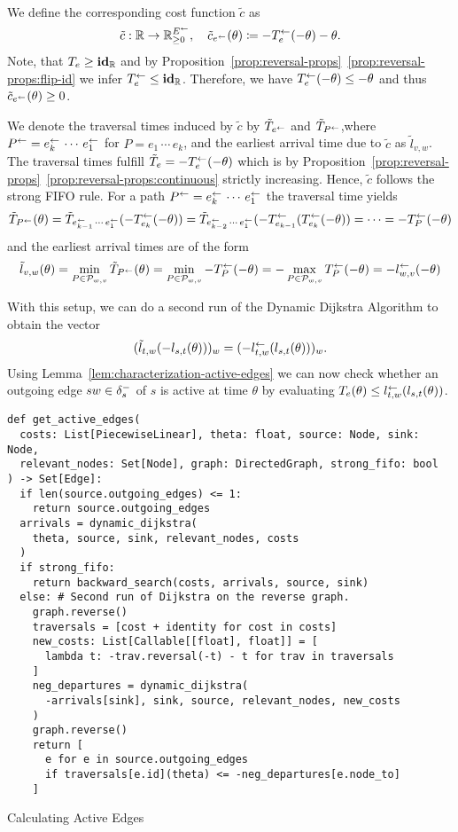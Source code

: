 We define the corresponding cost function $\tilde c$ as \[
    \tilde c : \mathbb{R} \rightarrow \mathbb{R}_{\geq0}^{E^{\leftarrow}}, \quad
    \tilde c_{e^{\leftarrow}}(\theta) \coloneqq - T_e^{\leftarrow}(-\theta) - \theta.
\]
Note, that $T_e  \geq \mathbf{id}_{\mathbb{R}}$ and by Proposition~\ref{prop:reversal-props}~\ref{prop:reversal-props:flip-id} we infer $T_e^{\leftarrow} \leq \mathbf{id}_{\mathbb{R}}$.
Therefore, we have $T_e^{\leftarrow}(-\theta) \leq -\theta$ and thus $\tilde c_{e^{\leftarrow}}(\theta) \geq 0$.

We denote the traversal times induced by $\tilde c$ by $\tilde T_{e^{\leftarrow}}$ and $\tilde T_{P^{\leftarrow}}$,where $P^{\leftarrow} = e_k^{\leftarrow} \, \cdots \, e_1^{\leftarrow}$ for $P = e_1\,\cdots\, e_k$,
and the earliest arrival time due to $\tilde c$ as $\tilde l_{v,w}$.
The traversal times fulfill $\tilde T_e = -T_e^{\leftarrow}(-\theta)$ which is by Proposition~\ref{prop:reversal-props}~\ref{prop:reversal-props:continuous} strictly increasing.
Hence, $\tilde c$ follows the strong FIFO rule.
For a path $P^{\leftarrow} = e_k^{\leftarrow}\,\cdots\, e_1^{\leftarrow}$ the traversal time yields
\[
    \tilde T_{P^{\leftarrow}} (\theta)
    = \tilde T_{e_{k-1}^{\leftarrow}\,\cdots\,e_1^{\leftarrow}}(- T_{e_k}^{\leftarrow} ( - \theta ))
    = \tilde T_{e_{k-2}^{\leftarrow}\,\cdots\,e_1^{\leftarrow}}(-T_{e_{k-1}}^{\leftarrow} (T_{e_k}^{\leftarrow} ( - \theta ))
    = \cdots
    = - T_P^{\leftarrow}(-\theta)
\]
and the earliest arrival times are of the form
\[
    \tilde l_{v,w}(\theta)
    = \min_{P\in\mathcal{P}_{w,v}} \tilde T_{P^{\leftarrow}}(\theta)
    = \min_{P\in\mathcal{P}_{w,v}} - T_P^{\leftarrow}(-\theta)
    = - \max_{P\in\mathcal{P}_{w,v}} T_P^{\leftarrow}(-\theta)
    = - l_{w,v}^{\leftarrow}(-\theta)
\]

With this setup, we can do a second run of the Dynamic Dijkstra Algorithm to obtain the vector \[
    (\tilde l_{t,w}( - l_{s,t}(\theta) ))_w = (- l_{t,w}^{\leftarrow}( l_{s,t}(\theta) ))_w.
\]
Using Lemma~\ref{lem:characterization-active-edges} we can now check whether an outgoing edge $sw\in\delta^-_{s}$ of $s$ is active at time $\theta$ by evaluating $T_e(\theta) \leq l_{t,w}^{\leftarrow}( l_{s,t}(\theta))$.

\begin{algorithm}[ht]
    \begin{verbatim}
def get_active_edges(
  costs: List[PiecewiseLinear], theta: float, source: Node, sink: Node,
  relevant_nodes: Set[Node], graph: DirectedGraph, strong_fifo: bool
) -> Set[Edge]:
  if len(source.outgoing_edges) <= 1:
    return source.outgoing_edges
  arrivals = dynamic_dijkstra(
    theta, source, sink, relevant_nodes, costs
  )
  if strong_fifo:
    return backward_search(costs, arrivals, source, sink)
  else: # Second run of Dijkstra on the reverse graph.
    graph.reverse()
    traversals = [cost + identity for cost in costs]
    new_costs: List[Callable[[float], float]] = [
      lambda t: -trav.reversal(-t) - t for trav in traversals
    ]
    neg_departures = dynamic_dijkstra(
      -arrivals[sink], sink, source, relevant_nodes, new_costs
    )
    graph.reverse()
    return [
      e for e in source.outgoing_edges
      if traversals[e.id](theta) <= -neg_departures[e.node_to]
    ]
  \end{verbatim}
  \caption{Calculating Active Edges}
  \label{alg:calculate-active-edges}
\end{algorithm}


